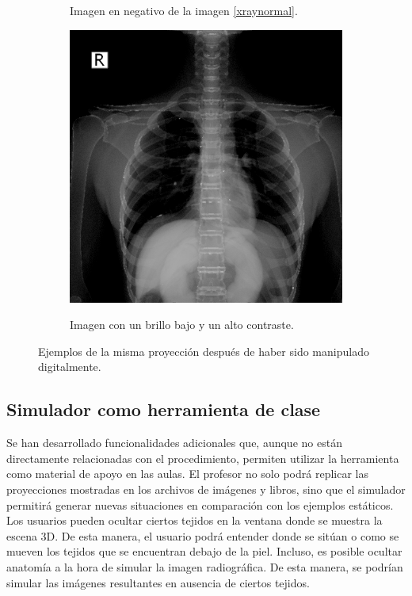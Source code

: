 \begin{figure}[ht]
\begin{subfigure}[b]{0.3\linewidth}
        \caption{Imagen en negativo de la imagen \ref{xraynormal}.}
    \end{subfigure}
    \null\hfill
     \begin{subfigure}[b]{0.3\linewidth}
        \centering
        {\includegraphics[width=\linewidth]{IMG/XRayMaleFilter2.png}}
        \caption{Imagen con un brillo bajo y un alto contraste.}
    \end{subfigure}
    \caption{\label{fig:imgmani}  Ejemplos de la misma proyección después de haber sido manipulado digitalmente.}
   \end{figure}



\subsection{Simulador como herramienta de clase}
\label{xray:sim}

Se han desarrollado funcionalidades adicionales que, aunque no están directamente relacionadas con el procedimiento, permiten utilizar la herramienta como material de apoyo en las aulas. El profesor no solo podrá replicar las proyecciones mostradas en los archivos de imágenes y libros, sino que el simulador permitirá generar nuevas situaciones en comparación con los ejemplos estáticos.  %
Los usuarios pueden ocultar ciertos tejidos en la ventana donde se muestra la escena 3D. De esta manera, el usuario podrá entender donde se sitúan o como se mueven los tejidos que se encuentran debajo de la piel. Incluso, es posible ocultar anatomía a la hora de simular la imagen radiográfica. De esta manera, se podrían  simular las imágenes resultantes en ausencia de ciertos tejidos. 

